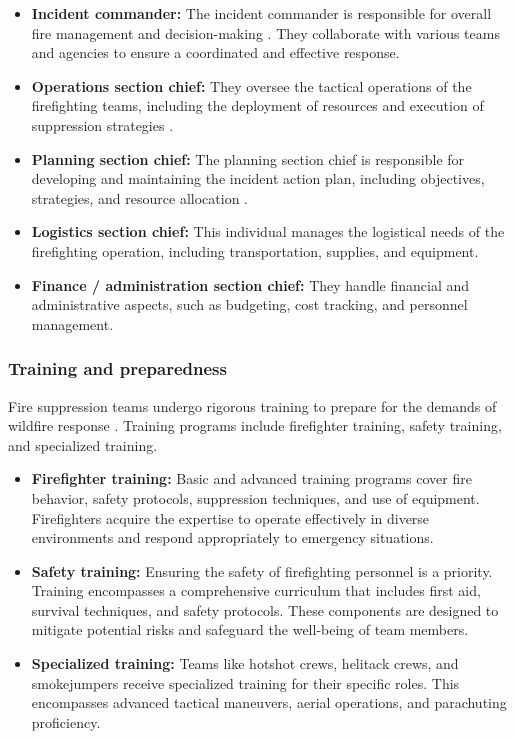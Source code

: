 \documentclass[
  12 pt,
]{Nemilov}
\begin{document}
\begin{itemize}
\item
  \textbf{Incident commander:} The incident commander is responsible for overall fire management and decision-making \citep{rake2009perceptions}. They collaborate with various teams and agencies to ensure a coordinated and effective response.
\item
  \textbf{Operations section chief:} They oversee the tactical operations of the firefighting teams, including the deployment of resources and execution of suppression strategies \citep{deal2006beyond, hunter1993oiling}.
\item
  \textbf{Planning section chief:} The planning section chief is responsible for developing and maintaining the incident action plan, including objectives, strategies, and resource allocation \citep{cadd1999ics, deal2006beyond}.
\item
  \textbf{Logistics section chief:} This individual manages the logistical needs of the firefighting operation, including transportation, supplies, and equipment.
\item
  \textbf{Finance / administration section chief:} They handle financial and administrative aspects, such as budgeting, cost tracking, and personnel management.
\end{itemize}

\subsubsection{Training and preparedness}\label{training-and-preparedness}

Fire suppression teams undergo rigorous training to prepare for the demands of wildfire response \citep{dorrer2018system, tedim2020can}. Training programs include firefighter training, safety training, and specialized training.

\begin{itemize}
\item
  \textbf{Firefighter training:} Basic and advanced training programs cover fire behavior, safety protocols, suppression techniques, and use of equipment. Firefighters acquire the expertise to operate effectively in diverse environments and respond appropriately to emergency situations.
\item
  \textbf{Safety training:} Ensuring the safety of firefighting personnel is a priority. Training encompasses a comprehensive curriculum that includes first aid, survival techniques, and safety protocols. These components are designed to mitigate potential risks and safeguard the well-being of team members.
\item
  \textbf{Specialized training:} Teams like hotshot crews, helitack crews, and smokejumpers receive specialized training for their specific roles. This encompasses advanced tactical maneuvers, aerial operations, and parachuting proficiency.
\end{itemize}
\end{document}
